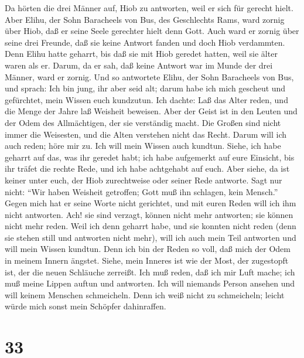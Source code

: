  Da hörten die drei Männer auf, Hiob zu antworten, weil er
sich für gerecht hielt.  Aber Elihu, der Sohn Baracheels von
Bus, des Geschlechts Rams, ward zornig über Hiob, daß er seine Seele
gerechter hielt denn Gott.  Auch ward er zornig über seine
drei Freunde, daß sie keine Antwort fanden und doch Hiob verdammten.
 Denn Elihu hatte geharrt, bis daß sie mit Hiob geredet
hatten, weil sie älter waren als er.  Darum, da er sah, daß
keine Antwort war im Munde der drei Männer, ward er zornig. 
Und so antwortete Elihu, der Sohn Baracheels von Bus, und sprach: Ich
bin jung, ihr aber seid alt; darum habe ich mich gescheut und
gefürchtet, mein Wissen euch kundzutun.  Ich dachte: Laß das
Alter reden, und die Menge der Jahre laß Weisheit beweisen. 
Aber der Geist ist in den Leuten und der Odem des Allmächtigen, der sie
verständig macht.  Die Großen sind nicht immer die
Weisesten, und die Alten verstehen nicht das Recht.  Darum
will ich auch reden; höre mir zu. Ich will mein Wissen auch kundtun.
 Siehe, ich habe geharrt auf das, was ihr geredet habt; ich
habe aufgemerkt auf eure Einsicht, bis ihr träfet die rechte Rede,
 und ich habe achtgehabt auf euch. Aber siehe, da ist
keiner unter euch, der Hiob zurechtweise oder seiner Rede antworte.
 Sagt nur nicht: ``Wir haben Weisheit getroffen; Gott muß
ihn schlagen, kein Mensch.''  Gegen mich hat er seine Worte
nicht gerichtet, und mit euren Reden will ich ihm nicht antworten.
 Ach! sie sind verzagt, können nicht mehr antworten; sie
können nicht mehr reden.  Weil ich denn geharrt habe, und
sie konnten nicht reden (denn sie stehen still und antworten nicht
mehr),  will ich auch mein Teil antworten und will mein
Wissen kundtun.  Denn ich bin der Reden so voll, daß mich
der Odem in meinem Innern ängstet.  Siehe, mein Inneres ist
wie der Most, der zugestopft ist, der die neuen Schläuche zerreißt.
 Ich muß reden, daß ich mir Luft mache; ich muß meine
Lippen auftun und antworten.  Ich will niemands Person
ansehen und will keinem Menschen schmeicheln.  Denn ich
weiß nicht zu schmeicheln; leicht würde mich sonst mein Schöpfer
dahinraffen.

\hypertarget{section-32}{%
\section{33}\label{section-32}}


